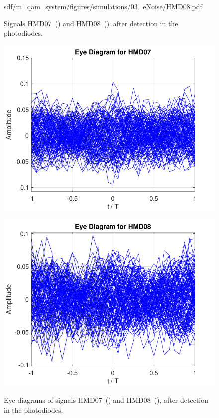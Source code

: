 \begin{figure}[H]
\begin{minipage}{0.45\textwidth}
		{sdf/m_qam_system/figures/simulations/03_eNoise/HMD08.pdf}
		\subcaption{}\label{fig:sim_eNoiseHmd08}
	\end{minipage}
	\caption{Signals HMD07~() and 
		HMD08~(), after detection in the 
		photodiodes.}\label{fig:sim_eNoiseHmd0708}
\end{figure}


\begin{figure}[H]
	\centering
	\begin{minipage}{0.45\textwidth}
		\centering
		\includegraphics[width=1\textwidth]		
		{./sdf/m_qam_system/figures/simulations/03_eNoise/HMD07_ed.pdf}
		\subcaption{}\label{fig:sim_eNoiseHmd07ed}
	\end{minipage}
	\begin{minipage}{0.45\textwidth}
		\centering
		\includegraphics[width=1\textwidth]
		{sdf/m_qam_system/figures/simulations/03_eNoise/HMD08_ed.pdf}
		\subcaption{}\label{fig:sim_eNoiseHmd08ed}
	\end{minipage}
	\caption{Eye diagrams of signals HMD07~() and 
		HMD08~(), after detection in the 
		photodiodes.}\label{fig:sim_eNoiseHmd0708ed}
\end{figure}

